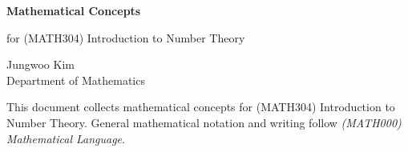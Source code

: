 \documentclass[11pt,oneside]{article}
\begin{document}
\thispagestyle{empty}

\begin{center}
    \vspace*{1.1cm}

    {\LARGE\bfseries Mathematical Concepts\par}

    \vspace{0.25cm}

    {\large for (MATH304) Introduction to Number Theory\par}

    \vspace{0.75cm}

    {\normalsize
    Jungwoo Kim\\
    Department of Mathematics\\
    \PohangUniversityOfScienceAndTechnology
    \par}
\end{center}

\vspace{0.45cm}

This document collects mathematical concepts for (MATH304) Introduction to Number Theory. General mathematical notation and writing follow \textit{(MATH000) Mathematical Language}.
\end{document}
